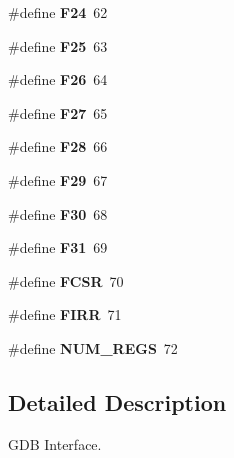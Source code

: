 \begin{DoxyCompactItemize}
\#define {\bfseries F24}~62
\item 
\mbox{\label{group__mips__gdb_gaecd53da786cea6aaccbca8096d330646}} 
\#define {\bfseries F25}~63
\item 
\mbox{\label{group__mips__gdb_ga908d17326a6cb52f0a0a2e29189b6561}} 
\#define {\bfseries F26}~64
\item 
\mbox{\label{group__mips__gdb_gad57face443a41cb592df688de8ed2bef}} 
\#define {\bfseries F27}~65
\item 
\mbox{\label{group__mips__gdb_ga4cb65eb6e065b9fa9102f58095002786}} 
\#define {\bfseries F28}~66
\item 
\mbox{\label{group__mips__gdb_ga488ec01cc023d6defb8f91097f96db19}} 
\#define {\bfseries F29}~67
\item 
\mbox{\label{group__mips__gdb_ga57b3dd5403df303308314dd934b47479}} 
\#define {\bfseries F30}~68
\item 
\mbox{\label{group__mips__gdb_ga33527dad7e9941d2b173d27ff6d46d7c}} 
\#define {\bfseries F31}~69
\item 
\mbox{\label{group__mips__gdb_gacdd7ee09d9b800a9bc36af11ae79d143}} 
\#define {\bfseries F\+C\+SR}~70
\item 
\mbox{\label{group__mips__gdb_gaa592020daef9525d93d4edae35f391ba}} 
\#define {\bfseries F\+I\+RR}~71
\item 
\mbox{\label{group__mips__gdb_ga50ea53d10916f14f7298e6371ec9ef78}} 
\#define {\bfseries N\+U\+M\+\_\+\+R\+E\+GS}~72
\end{DoxyCompactItemize}


\subsection{Detailed Description}
G\+DB Interface. 

